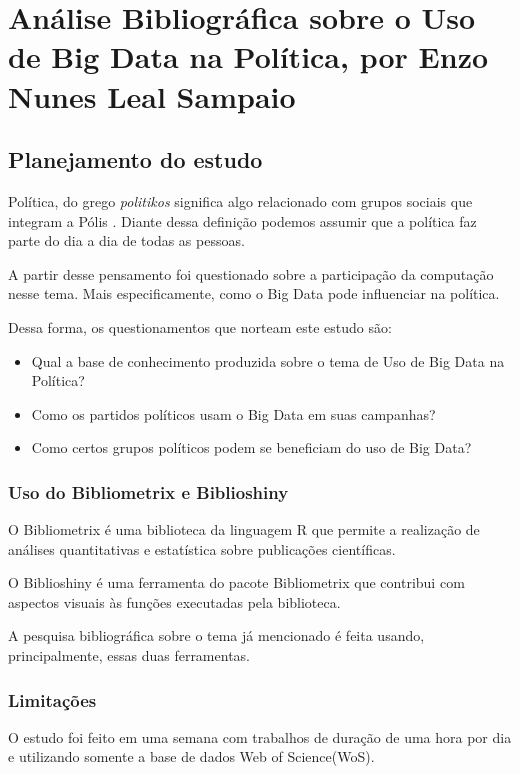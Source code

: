 \chapter{Análise Bibliográfica sobre o Uso de Big Data na Política, por Enzo Nunes Leal Sampaio}

\section{Planejamento do estudo}
Política, do grego \textit{politikos} significa algo relacionado com grupos sociais que integram a Pólis \citep{wikipedia_politica_nodate}. Diante dessa definição podemos assumir que a política faz parte do dia a dia de todas as pessoas.

A partir desse pensamento foi questionado sobre a participação da computação nesse tema. Mais especificamente, como o Big Data pode influenciar na política.

Dessa forma, os questionamentos que norteam este estudo são:

\begin{itemize}
    \item Qual a base de conhecimento produzida sobre o tema de Uso de Big Data na Política?
    \item Como os partidos políticos usam o Big Data em suas campanhas?
    \item Como certos grupos políticos podem se beneficiam do uso de Big Data?
\end{itemize}

\subsection{Uso do Bibliometrix e Biblioshiny}

O Bibliometrix é uma biblioteca da linguagem R que permite a realização de análises quantitativas e estatística sobre publicações científicas.

O Biblioshiny é uma ferramenta do pacote Bibliometrix que contribui com aspectos visuais às funções executadas pela biblioteca.

A pesquisa bibliográfica sobre o tema já mencionado é feita usando, principalmente, essas duas ferramentas.

\subsection{Limitações}
O estudo foi feito em uma semana com trabalhos de duração de uma hora por dia e utilizando somente a base de dados Web of Science(WoS).

